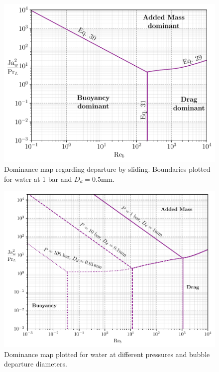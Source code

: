 \begin{figure}[h!]
\centering
\includegraphics[width=1.0\linewidth]{img/forces/ND_map1.pdf}
\caption{Dominance map regarding departure by sliding. Boundaries plotted for water at 1 bar and $D_{d}=0.5$mm.}
\label{fig:ND_map1}
\end{figure}





\begin{figure}[h!]
\centering
\includegraphics[width=1.0\textwidth]{img/forces/press_map.pdf}
\caption{Dominance map plotted for water at different pressures and bubble departure diameters.}
\label{fig:press_map}
\end{figure}





